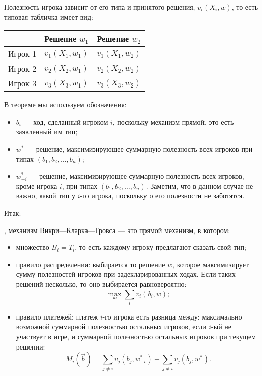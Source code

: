 Полезность игрока зависит от его типа и принятого решения, $ v_{i}(X_{i},w) $, то есть типовая табличка имеет вид:

\begin{tabular}{c|cc}
& Решение $ w_{1} $ & Решение $ w_{2} $ \\
\hline
Игрок 1 & $v_{1}(X_{1},w_{1})$ & $v_{1}(X_{1},w_{2})$ \\
Игрок 2 & $v_{2}(X_{2},w_{1})$ & $v_{2}(X_{2},w_{2})$ \\
Игрок 3 & $v_{3}(X_{3},w_{1})$ & $v_{3}(X_{3},w_{2})$ \\
\end{tabular}


В теореме мы используем обозначения:

\begin{itemize}
\item $b_{i}$ — ход, сделанный игроком $ i $, поскольку механизм прямой, это есть заявленный им тип;
\item $w^{*}$ — решение, максимизирующее суммарную полезность всех игроков при типах $ (b_{1},b_{2},\ldots,b_{n}) $;
\item $w_{-i}^{*} $ — решение, максимизирующее суммарную полезность всех игроков, кроме игрока $ i $, при типах $ (b_{1},b_{2},\ldots,b_{n}) $. Заметим, что в данном случае не важно, какой тип у $ i $-го игрока, поскольку о его полезности не заботятся.
\end{itemize}

Итак:
\begin{mydef} , механизм Викри—Кларка—Гровса — это прямой механизм, в котором:
\begin{itemize}
\item множество $ B_{i}=T_{i} $, то есть каждому игроку предлагают сказать свой тип;
\item правило распределения: выбирается то решение $ w $, которое максимизирует сумму полезностей игроков при задекларированных ходах. Если таких решений несколько, то оно выбирается равновероятно:
\begin{equation}
\max_{w} \sum_{i} v_{i}(b_{i},w);
\end{equation}
\item правило платежей: платеж $ i $-го игрока есть разница между: максимально возможной суммарной полезностью остальных игроков, если $ i $-ый не участвует в игре, и суммарной полезностью остальных игроков при текущем решении:
\begin{equation}
M_{i}(\vec{b})=\sum_{j\neq i} v_{j}(b_{j},w_{-i}^{*})-\sum_{j\neq i} v_{j}(b_{j},w^{*}).
\end{equation}
\end{itemize}
\end{mydef}

